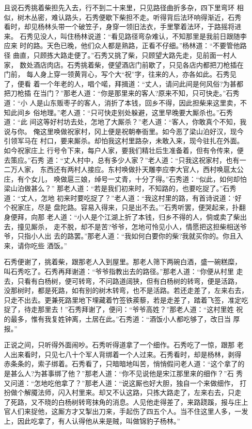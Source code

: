 且说石秀挑着柴担先入去，行不到二十来里，只见路径曲折多杂，四下里弯环
相似，树木丛密，难认路头，石秀便歇下柴担不走。听得背后法环响得渐近，石秀
看时，却见杨林头带一个破笠子，身穿一领旧法衣，手里擎着法环，于路摇将进来。
石秀见没人，叫住杨林说道：“看见路径弯杂难认，不知那里是我前日跟随李应来
时的路。天色已晚，他们众人都是熟路，正看不仔细。”杨林道：“不要管他路径
曲直，只顾拣大路走便了。”石秀又挑了柴，只顾望大路先走，见前面一村人家，
数处酒店肉店。石秀挑着柴，便望酒店门前歇了，只见各店内都把刀枪插在门前，
每人身上穿一领黄背心，写个大“祝”字，往来的人，亦各如此。石秀见了，便看
着一个年老的人，唱个喏，拜揖道：“丈人，请问此间是何风俗?为甚都把刀枪插
在当门？”那老人道：“你是那里来的客人?原来不知，只可快走。”石秀道：“小
人是山东贩枣子的客人，消折了本钱，回乡不得，因此担柴来这里卖，不知此间乡
俗地理。”老人道：“只可快走别处躲避，这里早晚要大厮杀也。”石秀道：“此
间这等好村坊去处，怎地了大厮杀？”老人道：“客人，你敢真个不知，我说与你。
俺这里唤做祝家村，冈上便是祝朝奉衙里。如今恶了梁山泊好汉，现今引领军马在
村口，要来厮杀。却怕我这村里路杂，未敢入来，现今驻扎在外面。如今祝家庄上
行号令下来，每户人家，要我们精壮后生准备着，但有令传来，便去策应。”石秀
道：“丈人村中，总有多少人家？”老人道：“只我这祝家村，也有一二万人家，
东西还有两村人接应。东村唤做扑天雕李应李大官人，西村唤扈太公庄，有个女儿，
唤做扈三娘，绰号一丈青，十分了得。”石秀道：“似此，如何却怕梁山泊做甚么？”
那老人道：“若是我们初来时，不知路的，也要吃捉了。”石秀道：“丈人，怎地
初来时要吃捉了？”老人道：“我这村里的路，有首诗说道：‘好个祝家庄，尽是
盘陀路。容易入得来，只是出不去。’”石秀听罢，便哭起来，扑翻身便拜，向那
老人道：“小人是个江湖上折了本钱，归乡不得的人，倘或卖了柴出去，撞见厮杀，
走不脱，却不是苦?爷爷，怎地可怜见小人，情愿把这担柴相送爷爷，只指小人出
去的路罢。”那老人道：“我如何白要你的柴?我就买你的。你且入来，请你吃些
酒饭。”

石秀便谢了，挑着柴，跟那老人入到屋里。那老人筛下两碗白酒，盛一碗糕糜，
叫石秀吃了。石秀再拜谢道：“爷爷指教出去的路径。”那老人道：“你便从村里
走去，只看有白杨树，便可转弯，不问路道阔狭，但有白杨树的转弯，便是活路，
没那树时，都是死路，如有别的树木转弯，也不是活路。若还走差了，左来右去，
只走不出去。更兼死路里地下埋藏着竹签铁蒺藜，若是走差了，踏着飞签，准定吃
捉了，待走那里去！”石秀拜谢了，便问：“爷爷高姓？”那老人道：“这村里姓
祝的最多，惟有我复姓钟离，土居在此。”石秀道：“酒饭小人都吃够了，改日当
厚报。”

正说之间，只听得外面闹吵。石秀听得道拿了一个细作。石秀吃了一惊，跟那
老人出来看时，只见七八十个军人背绑着一个人过来。石秀看时，却是杨林，剥得
赤条条的，索子绑着。石秀看了，只暗暗地叫苦，悄悄假问老人道：“这个拿了的
是甚么人?为甚事绑了他？”那老人道：“你不见说他是宋江那里来的细作？”石
秀又问道：“怎地吃他拿了？”那老人道：“说这厮也好大胆，独自一个来做细作，
打扮做个解魇法师，闪入村里来。却又不认这路，只拣大路走了，左来右去，只走
了死路，又不晓的白杨树转弯抹角的消息。人见他走得差了，来路跷蹊，报与庄上
官人们来捉他，这厮方才又掣出刀来，手起伤了四五个人。当不住这里人多，一发
上，因此吃拿了，有人认得他从来是贼，叫做锦豹子杨林。”

